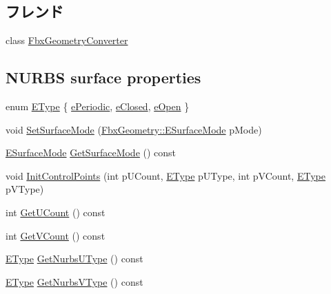 \subsection*{フレンド}
\begin{DoxyCompactItemize}
\item 
class \hyperlink{class_fbx_nurbs_a2c65afd59c2bab21d92824fbe4422545}{Fbx\+Geometry\+Converter}
\end{DoxyCompactItemize}
\subsection*{N\+U\+R\+BS surface properties}
\begin{DoxyCompactItemize}
\item 
enum \hyperlink{class_fbx_nurbs_a16d9562676c9d3511503551790c55643}{E\+Type} \{ \hyperlink{class_fbx_nurbs_a16d9562676c9d3511503551790c55643a74db20646f0e36e6a96fddbf76f4bacd}{e\+Periodic}, 
\hyperlink{class_fbx_nurbs_a16d9562676c9d3511503551790c55643a14f1b70767443212f08948e5fbb59946}{e\+Closed}, 
\hyperlink{class_fbx_nurbs_a16d9562676c9d3511503551790c55643a7a7a84326a724c57e0878258c9b25864}{e\+Open}
 \}
\item 
void \hyperlink{class_fbx_nurbs_a6687f58ab39b07a3ce686992e5d8c9f8}{Set\+Surface\+Mode} (\hyperlink{class_fbx_geometry_adb9d2e34481a2cb40f1d783c665794db}{Fbx\+Geometry\+::\+E\+Surface\+Mode} p\+Mode)
\item 
\hyperlink{class_fbx_geometry_adb9d2e34481a2cb40f1d783c665794db}{E\+Surface\+Mode} \hyperlink{class_fbx_nurbs_a9b482acc4ada0ebd438e8fde99c54b7e}{Get\+Surface\+Mode} () const
\item 
void \hyperlink{class_fbx_nurbs_a96a933ed29981ac358b4d3ed63ed3b72}{Init\+Control\+Points} (int p\+U\+Count, \hyperlink{class_fbx_nurbs_a16d9562676c9d3511503551790c55643}{E\+Type} p\+U\+Type, int p\+V\+Count, \hyperlink{class_fbx_nurbs_a16d9562676c9d3511503551790c55643}{E\+Type} p\+V\+Type)
\item 
int \hyperlink{class_fbx_nurbs_aa1b6891345f56dd4e30780853ec4721a}{Get\+U\+Count} () const
\item 
int \hyperlink{class_fbx_nurbs_a0592be67af1b1e3f663964f932f12df4}{Get\+V\+Count} () const
\item 
\hyperlink{class_fbx_nurbs_a16d9562676c9d3511503551790c55643}{E\+Type} \hyperlink{class_fbx_nurbs_a3e11b91a48634ca8a7e082f80aae9013}{Get\+Nurbs\+U\+Type} () const
\item 
\hyperlink{class_fbx_nurbs_a16d9562676c9d3511503551790c55643}{E\+Type} \hyperlink{class_fbx_nurbs_a07928e9890078aa451609132d263167c}{Get\+Nurbs\+V\+Type} () const

\end{DoxyCompactItemize}
